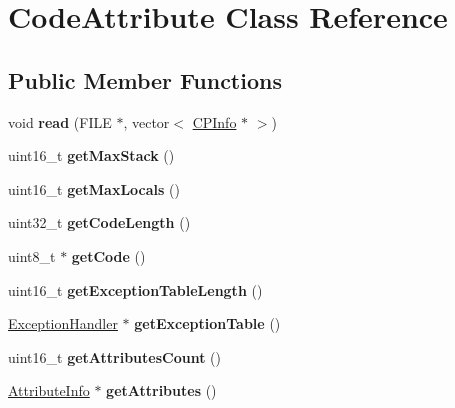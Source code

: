 \hypertarget{classCodeAttribute}{}\section{Code\+Attribute Class Reference}
\label{classCodeAttribute}
\subsection*{Public Member Functions}
\begin{DoxyCompactItemize}
\item 
void {\bfseries read} (F\+I\+LE $\ast$, vector$<$ \hyperlink{classCPInfo}{C\+P\+Info} $\ast$ $>$)\hypertarget{classCodeAttribute_acb8378aad8421371b26442ffbf778de4}{}\label{classCodeAttribute_acb8378aad8421371b26442ffbf778de4}

\item 
uint16\+\_\+t {\bfseries get\+Max\+Stack} ()\hypertarget{classCodeAttribute_a9eb6a6b7bd7bd870f745bc089d407e45}{}\label{classCodeAttribute_a9eb6a6b7bd7bd870f745bc089d407e45}

\item 
uint16\+\_\+t {\bfseries get\+Max\+Locals} ()\hypertarget{classCodeAttribute_aa97ceb04d99e607389a4cf08b3b65db1}{}\label{classCodeAttribute_aa97ceb04d99e607389a4cf08b3b65db1}

\item 
uint32\+\_\+t {\bfseries get\+Code\+Length} ()\hypertarget{classCodeAttribute_ae365ff1b5fc98df49f3f61379d59978f}{}\label{classCodeAttribute_ae365ff1b5fc98df49f3f61379d59978f}

\item 
uint8\+\_\+t $\ast$ {\bfseries get\+Code} ()\hypertarget{classCodeAttribute_a713d99a501cb88c344013b5820ea6e8b}{}\label{classCodeAttribute_a713d99a501cb88c344013b5820ea6e8b}

\item 
uint16\+\_\+t {\bfseries get\+Exception\+Table\+Length} ()\hypertarget{classCodeAttribute_a4a1408612b357305d2c27673d8e18124}{}\label{classCodeAttribute_a4a1408612b357305d2c27673d8e18124}

\item 
\hyperlink{classExceptionHandler}{Exception\+Handler} $\ast$ {\bfseries get\+Exception\+Table} ()\hypertarget{classCodeAttribute_a7905efeeb4bbdd57cc07605757372db5}{}\label{classCodeAttribute_a7905efeeb4bbdd57cc07605757372db5}

\item 
uint16\+\_\+t {\bfseries get\+Attributes\+Count} ()\hypertarget{classCodeAttribute_a795890e641c508602f2b842af5779fc6}{}\label{classCodeAttribute_a795890e641c508602f2b842af5779fc6}

\item 
\hyperlink{classAttributeInfo}{Attribute\+Info} $\ast$ {\bfseries get\+Attributes} ()\hypertarget{classCodeAttribute_a5f36ae9a19d451dbb7c1aedad06454ff}{}\label{classCodeAttribute_a5f36ae9a19d451dbb7c1aedad06454ff}

\end{DoxyCompactItemize}


